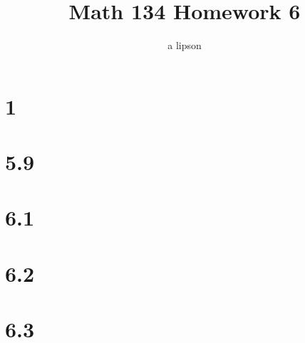 \documentclass{article}
\title{Math 134 Homework 6}
\author{a lipson}
\begin{document}
\maketitle

\section*{1}


\section*{5.9}


\section*{6.1}


\section*{6.2}


\section*{6.3}

\end{document}
